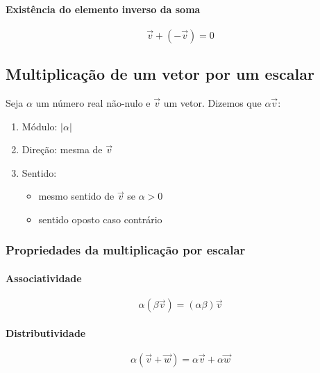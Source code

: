 \paragraph{Existência do elemento inverso da
soma}\label{existuxeancia-do-elemento-inverso-da-soma}

\[
\vec{v} + (-\vec{v}) = 0
\]

\subsection{Multiplicação de um vetor por um
escalar}\label{multiplicauxe7uxe3o-de-um-vetor-por-um-escalar}

Seja $\alpha$ um número real não-nulo e $\vec{v}$ um vetor. Dizemos que
$\alpha \vec{v}$:

\begin{enumerate}
\def\labelenumi{\arabic{enumi}.}
\itemsep1pt\parskip0pt
\item
  Módulo: $|\alpha|$
\item
  Direção: mesma de $\vec{v}$
\item
  Sentido:

  \begin{itemize}
  \itemsep1pt\parskip0pt
  \item
    mesmo sentido de $\vec{v}$ se $\alpha > 0$
  \item
    sentido oposto caso contrário
  \end{itemize}
\end{enumerate}

\subsubsection{Propriedades da multiplicação por
escalar}\label{propriedades-da-multiplicauxe7uxe3o-por-escalar}

\paragraph{Associatividade}\label{associatividade-1}

\[
\alpha (\beta \vec{v}) = (\alpha \beta) \vec{v}
\]

\paragraph{Distributividade}\label{distributividade}

\[
\alpha (\vec{v} + \vec{w}) = \alpha \vec{v} + \alpha \vec{w}
\]

